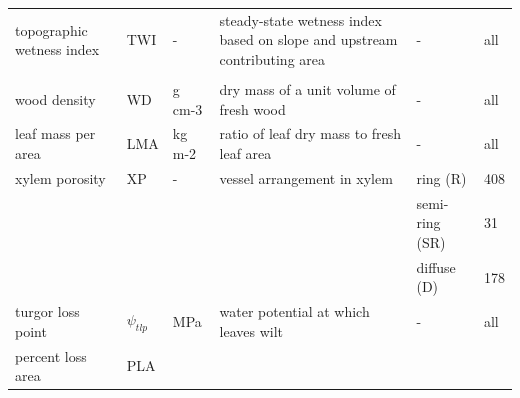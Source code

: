 \documentclass[
]{article}
\begin{document}
\begin{table}[!h]
{\begin{tabular}[t]{lll>{\raggedright\arraybackslash}p{7cm}ll}
\hspace{1em}\hspace{1em}topographic wetness index & TWI & - & steady-state wetness index based on slope and upstream contributing area & - & all\\
\addlinespace[.4em]
\multicolumn{1}{l}{\textit{species' traits}}\\
\hspace{1em}\hspace{1em}wood density & WD & g cm-3 & dry mass of a unit volume of fresh wood & - & all\\
\hspace{1em}\hspace{1em}leaf mass per area & LMA & kg m-2 & ratio of leaf dry mass to fresh leaf area & - & all\\
\hspace{1em}\hspace{1em}xylem porosity & XP & - & vessel arrangement in xylem & ring (R) & 408\\
\hspace{1em}\hspace{1em} &  &  &  & semi-ring (SR) & 31\\
\hspace{1em}\hspace{1em} &  &  &  & diffuse (D) & 178\\
\hspace{1em}\hspace{1em}turgor loss point & $\psi_{tlp}$ & MPa & water potential at which leaves wilt & - & all\\
\hspace{1em}\hspace{1em}percent loss area & PLA & %
\bottomrule
\end{tabular}}
\end{table}
\clearpage
\end{document}
